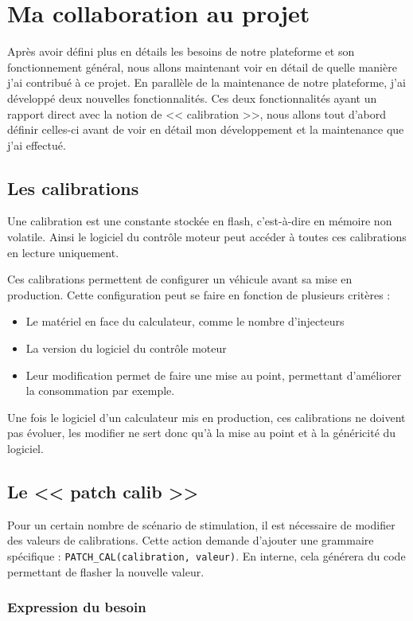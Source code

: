 \chapter{Ma collaboration au projet}\label{collab}
\putminitoc
Après avoir défini plus en détails les besoins de notre plateforme et son fonctionnement général, nous allons maintenant voir en détail de quelle manière j'ai contribué à ce projet. En parallèle de la maintenance de notre plateforme, j'ai développé deux nouvelles fonctionnalités. Ces deux fonctionnalités ayant un rapport direct avec la notion de << calibration >>, nous allons tout d'abord définir celles-ci avant de voir en détail mon développement et la maintenance que j'ai effectué.

\section{Les calibrations}
Une calibration est une constante stockée en flash, c'est-à-dire en mémoire non volatile. Ainsi le logiciel du contrôle moteur peut accéder à toutes ces calibrations en lecture uniquement.

Ces calibrations permettent de configurer un véhicule avant sa mise en production. Cette configuration peut se faire en fonction de plusieurs critères : 
\begin{itemize}
	\item Le matériel en face du calculateur, comme le nombre d'injecteurs
	\item La version du logiciel du contrôle moteur
	\item Leur modification permet de faire une mise au point, permettant d'améliorer la consommation par exemple.
\end{itemize}

Une fois le logiciel d'un calculateur mis en production, ces calibrations ne doivent pas évoluer, les modifier ne sert donc qu'à la mise au point et à la généricité du logiciel.
\vfill
\section{Le << patch calib >>}\label{patch}
Pour un certain nombre de scénario de stimulation, il est nécessaire de modifier des valeurs de calibrations. Cette action demande d'ajouter une grammaire spécifique : \texttt{PATCH\_CAL(calibration, valeur)}. En interne, cela générera du code permettant de flasher la nouvelle valeur.
%
\subsection{Expression du besoin}\label{besoin-patch}
